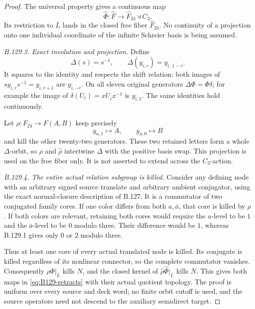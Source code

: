 \begin{proof}
The universal property gives a continuous map
\[
 \widehat\Phi:\widehat F\longrightarrow
                \widehat F_{24}\rtimes C_3.
\]
Its restriction to \(\overline L\) lands in the closed free
fiber \(\widehat F_{24}\). No continuity of a projection onto
one individual coordinate of the infinite Schreier basis is
being assumed.

\emph{B.129.3. Exact involution and projection.}
Define
\begin{equation}\label{eq:B129-Delta}
 \Delta(s)=s^{-1},\qquad
 \Delta(y_{i,r})=y_{\bar i,\,1-r}.
\end{equation}
It squares to the identity and respects the shift relation:
both images of \(sy_{i,r}s^{-1}=y_{i,r+1}\) are
\(y_{\bar i,-r}\). On all eleven original generators
\(\Delta\Phi=\Phi\delta\); for example the image of
\(\delta(U_i)=xU_{\bar i}x^{-1}\) is \(y_{\bar i,1}\).
The same identities hold continuously.

Let \(\rho:F_{24}\to F(A,B)\) keep precisely
\[
 y_{a,1}\mapsto A,\qquad y_{\bar a,0}\mapsto B
\]
and kill the other twenty-two generators. These two retained
letters form a whole \(\Delta\)-orbit, so \(\rho\) and
\(\widehat\rho\) intertwine \(\Delta\) with the positive basis
swap. This projection is used on the free fiber only. It is
not asserted to extend across the \(C_3\)-action.

\emph{B.129.4. The entire actual relation subgroup is killed.}
Consider any defining node with an arbitrary signed source
translate and arbitrary ambient conjugator, using the exact
normal-closure description of B.127. It is a commutator of
two conjugated family cores. If one color differs from both
\(a,\bar a\), that core is killed by \(\rho\). If both colors
are relevant, retaining both cores would require the
\(a\)-level to be \(1\) and the \(\bar a\)-level to be \(0\)
modulo three. Their difference would be \(1\), whereas
B.129.1 gives only \(0\) or \(2\) modulo three.

Thus at least one core of every actual translated node is
killed. Its conjugate is killed regardless of its nonlinear
connector, so the complete commutator vanishes. Consequently
\(\rho\Phi|_L\) kills \(N\), and the closed kernel of
\(\widehat\rho\widehat\Phi|_{\overline L}\) kills
\(\overline N\). This gives both maps in
\eqref{eq:B129-retracts} with their actual quotient topology.
The proof is uniform over every source and deck word; no
finite orbit cutoff is used, and the source operators need
not descend to the auxiliary semidirect target.


\end{proof}
